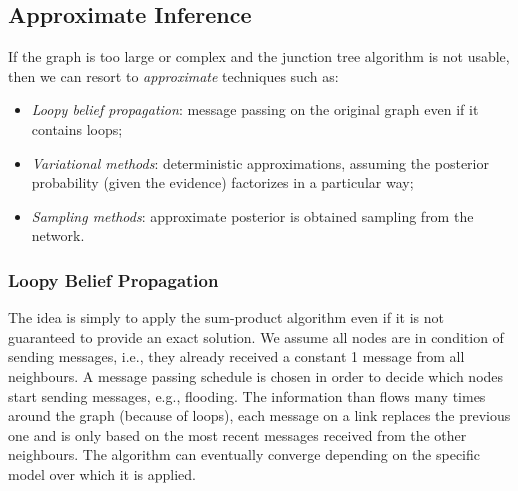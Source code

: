 \subsection{Approximate Inference}
If the graph is too large or complex and the junction tree algorithm is not usable, then we can resort to \textit{approximate} techniques such as:
\begin{itemize}
  \item \textit{Loopy belief propagation}: message passing on the original graph even if it contains loops;
  \item \textit{Variational methods}: deterministic approximations, assuming the posterior probability (given the evidence) factorizes in a particular way;
  \item \textit{Sampling methods}: approximate posterior is obtained sampling from the network.
\end{itemize}
%
\subsubsection{Loopy Belief Propagation}
The idea is simply to apply the sum-product algorithm even if it is not guaranteed to provide an exact solution. \newline
We assume all nodes are in condition of sending messages, i.e., they already received a constant 1 message from all neighbours. \newline
A message passing schedule is chosen in order to decide which nodes start sending messages, e.g., flooding. \newline
The information than flows many times around the graph (because of loops), each message on a link replaces the previous one and is only based on the most recent messages received from the other neighbours. \newline
The algorithm can eventually converge depending on the specific model over which it is applied. 
%
